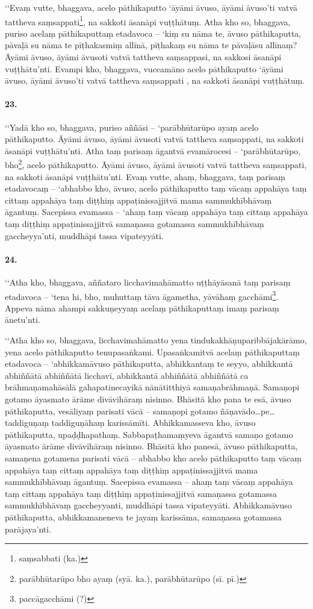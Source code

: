 ‘‘Evaṃ vutte, bhaggava, acelo pāthikaputto ‘āyāmi āvuso, āyāmi āvuso’ti vatvā tattheva saṃsappati\footnote{saṃsabbati (ka.)}, na sakkoti āsanāpi vuṭṭhātuṃ. Atha kho so, bhaggava, puriso acelaṃ pāthikaputtaṃ etadavoca – ‘kiṃ su nāma te, āvuso pāthikaputta, pāvaḷā su nāma te pīṭhakasmiṃ allīnā, pīṭhakaṃ su nāma te pāvaḷāsu allīnaṃ? Āyāmi āvuso, āyāmi āvusoti vatvā tattheva saṃsappasi, na sakkosi āsanāpi vuṭṭhātu’nti. Evampi kho, bhaggava, vuccamāno acelo pāthikaputto ‘āyāmi āvuso, āyāmi āvuso’ti vatvā tattheva saṃsappati , na sakkoti āsanāpi vuṭṭhātuṃ.

\paragraph{23.} ‘‘Yadā kho so, bhaggava, puriso aññāsi – ‘parābhūtarūpo ayaṃ acelo pāthikaputto. Āyāmi āvuso, āyāmi āvusoti vatvā tattheva saṃsappati, na sakkoti āsanāpi vuṭṭhātu’nti. Atha taṃ parisaṃ āgantvā evamārocesi – ‘parābhūtarūpo, bho\footnote{parābhūtarūpo bho ayaṃ (syā. ka.), parābhūtarūpo (sī. pī.)}, acelo pāthikaputto. Āyāmi āvuso, āyāmi āvusoti vatvā tattheva saṃsappati, na sakkoti āsanāpi vuṭṭhātu’nti. Evaṃ vutte, ahaṃ, bhaggava, taṃ parisaṃ etadavocaṃ – ‘abhabbo kho, āvuso, acelo pāthikaputto taṃ vācaṃ appahāya taṃ cittaṃ appahāya taṃ diṭṭhiṃ appaṭinissajjitvā mama sammukhībhāvaṃ āgantuṃ. Sacepissa evamassa – ‘ahaṃ taṃ vācaṃ appahāya taṃ cittaṃ appahāya taṃ diṭṭhiṃ appaṭinissajjitvā samaṇassa gotamassa sammukhībhāvaṃ gaccheyya’nti, muddhāpi tassa vipateyyāti.


\paragraph{24.} ‘‘Atha kho, bhaggava, aññataro licchavimahāmatto uṭṭhāyāsanā taṃ parisaṃ etadavoca – ‘tena hi, bho, muhuttaṃ tāva āgametha, yāvāhaṃ gacchāmi\footnote{paccāgacchāmi (?)}. Appeva nāma ahampi sakkuṇeyyaṃ acelaṃ pāthikaputtaṃ imaṃ parisaṃ ānetu’nti.

‘‘Atha kho so, bhaggava, licchavimahāmatto yena tindukakhāṇuparibbājakārāmo, yena acelo pāthikaputto tenupasaṅkami. Upasaṅkamitvā acelaṃ pāthikaputtaṃ etadavoca – ‘abhikkamāvuso pāthikaputta, abhikkantaṃ te seyyo, abhikkantā abhiññātā abhiññātā licchavī, abhikkantā abhiññātā abhiññātā ca brāhmaṇamahāsālā gahapatinecayikā nānātitthiyā samaṇabrāhmaṇā. Samaṇopi gotamo āyasmato ārāme divāvihāraṃ nisinno. Bhāsitā kho pana te esā, āvuso pāthikaputta, vesāliyaṃ parisati vācā – samaṇopi gotamo ñāṇavādo…pe… taddiguṇaṃ taddiguṇāhaṃ karissāmīti. Abhikkamasseva kho, āvuso pāthikaputta, upaḍḍhapathaṃ. Sabbapaṭhamaṃyeva āgantvā samaṇo gotamo āyasmato ārāme divāvihāraṃ nisinno. Bhāsitā kho panesā, āvuso pāthikaputta, samaṇena gotamena parisati vācā – abhabbo kho acelo pāthikaputto taṃ vācaṃ appahāya taṃ cittaṃ appahāya taṃ diṭṭhiṃ appaṭinissajjitvā mama sammukhībhāvaṃ āgantuṃ. Sacepissa evamassa – ahaṃ taṃ vācaṃ appahāya taṃ cittaṃ appahāya taṃ diṭṭhiṃ appaṭinissajjitvā samaṇassa gotamassa sammukhībhāvaṃ gaccheyyanti, muddhāpi tassa vipateyyāti. Abhikkamāvuso pāthikaputta, abhikkamaneneva te jayaṃ karissāma, samaṇassa gotamassa parājaya’nti.

